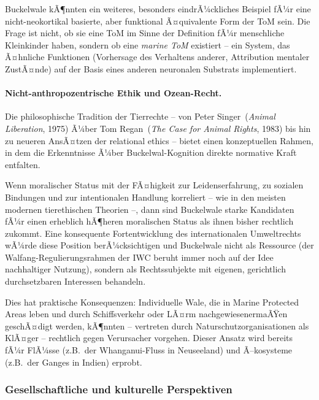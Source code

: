 ﻿\documentclass[12pt,a4paper]{article}
\theoremstyle{definition}
\theoremstyle{remark}
\begin{document}
Buckelwale kÃ¶nnten ein weiteres, besonders eindrÃ¼ckliches Beispiel fÃ¼r eine nicht-neokortikal basierte, aber funktional Ã¤quivalente Form der ToM sein. Die Frage ist nicht, ob sie eine ToM im Sinne der Definition fÃ¼r menschliche Kleinkinder haben, sondern ob eine \emph{marine ToM} existiert -- ein System, das Ã¤hnliche Funktionen (Vorhersage des Verhaltens anderer, Attribution mentaler ZustÃ¤nde) auf der Basis eines anderen neuronalen Substrats implementiert.

\paragraph{Nicht-anthropozentrische Ethik und Ozean-Recht.}
Die philosophische Tradition der Tierrechte -- von Peter Singer~(\emph{Animal Liberation}, 1975) Ã¼ber Tom Regan~(\emph{The Case for Animal Rights}, 1983) bis hin zu neueren AnsÃ¤tzen der relational ethics -- bietet einen konzeptuellen Rahmen, in dem die Erkenntnisse Ã¼ber Buckelwal-Kognition direkte normative Kraft entfalten.

Wenn moralischer Status mit der FÃ¤higkeit zur Leidenserfahrung, zu sozialen Bindungen und zur intentionalen Handlung korreliert -- wie in den meisten modernen tierethischen Theorien --, dann sind Buckelwale starke Kandidaten fÃ¼r einen erheblich hÃ¶heren moralischen Status als ihnen bisher rechtlich zukommt. Eine konsequente Fortentwicklung des internationalen Umweltrechts wÃ¼rde diese Position berÃ¼cksichtigen und Buckelwale nicht als Ressource (der Walfang-Regulierungsrahmen der IWC beruht immer noch auf der Idee nachhaltiger Nutzung), sondern als Rechtssubjekte mit eigenen, gerichtlich durchsetzbaren Interessen behandeln.

Dies hat praktische Konsequenzen: Individuelle Wale, die in Marine Protected Areas leben und durch Schiffsverkehr oder LÃ¤rm nachgewiesenermaÃŸen geschÃ¤digt werden, kÃ¶nnten -- vertreten durch Naturschutzorganisationen als KlÃ¤ger -- rechtlich gegen Verursacher vorgehen. Dieser Ansatz wird bereits fÃ¼r FlÃ¼sse (z.B.\ der Whanganui-Fluss in Neuseeland) und Ã–kosysteme (z.B.\ der Ganges in Indien) erprobt.

\subsubsection{Gesellschaftliche und kulturelle Perspektiven}
\end{document}
